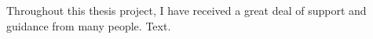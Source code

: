 
Throughout this thesis project, I have received a great deal of support and guidance from many
people.
Text.
